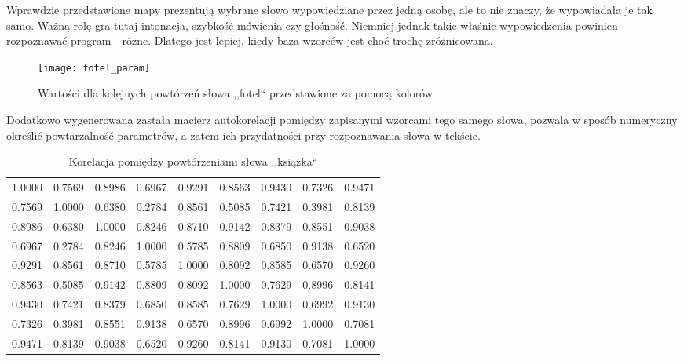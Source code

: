 Wprawdzie przedstawione mapy prezentują wybrane słowo wypowiedziane przez jedną osobę, ale to nie znaczy, że wypowiadała je tak samo. Ważną rolę gra tutaj intonacja, szybkość mówienia czy głośność. Niemniej jednak takie właśnie wypowiedzenia powinien rozpoznawać program - różne. Dlatego jest lepiej, kiedy baza wzorców jest choć trochę zróżnicowana.

\begin{figure}[H]
	\centering
	\texttt{[image: fotel\_param]}
	\caption{Wartości dla kolejnych powtórzeń słowa ,,fotel`` przedstawione za pomocą kolorów}
	\label{rys:fotel_param}
\end{figure}

Dodatkowo wygenerowana zastała macierz autokorelacji pomiędzy zapisanymi wzorcami tego samego słowa, pozwala w sposób numeryczny określić powtarzalność parametrów, a zatem  ich przydatności przy rozpoznawania słowa w tekście.

\begin{table}[H]
	\begin{center}
\begin{tabular}{ccccccccc}
	1.0000  &  0.7569  &  0.8986  &  0.6967  &  0.9291  &  0.8563  &  0.9430  &  0.7326  &  0.9471 \\
	0.7569  &  1.0000  &  0.6380  &  0.2784  &  0.8561  &  0.5085  &  0.7421  &  0.3981  &  0.8139 \\
	0.8986  &  0.6380  &  1.0000  &  0.8246  &  0.8710  &  0.9142  &  0.8379  &  0.8551  &  0.9038 \\
	0.6967  &  0.2784  &  0.8246  &  1.0000  &  0.5785  &  0.8809  &  0.6850  &  0.9138  &  0.6520 \\
	0.9291  &  0.8561  &  0.8710  &  0.5785  &  1.0000  &  0.8092  &  0.8585  &  0.6570  &  0.9260 \\
	0.8563  &  0.5085  &  0.9142  &  0.8809  &  0.8092  &  1.0000  &  0.7629  &  0.8996  &  0.8141 \\
	0.9430  &  0.7421  &  0.8379  &  0.6850  &  0.8585  &  0.7629  &  1.0000  &  0.6992  &  0.9130 \\
	0.7326  &  0.3981  &  0.8551  &  0.9138  &  0.6570  &  0.8996  &  0.6992  &  1.0000  &  0.7081 \\
	0.9471  &  0.8139  &  0.9038  &  0.6520  &  0.9260  &  0.8141  &  0.9130  &  0.7081  &  1.0000 
\end{tabular} 
	\end{center}
	\caption{Korelacja pomiędzy powtórzeniami słowa ,,książka``}
	\label{ControlTable}
\end{table}

